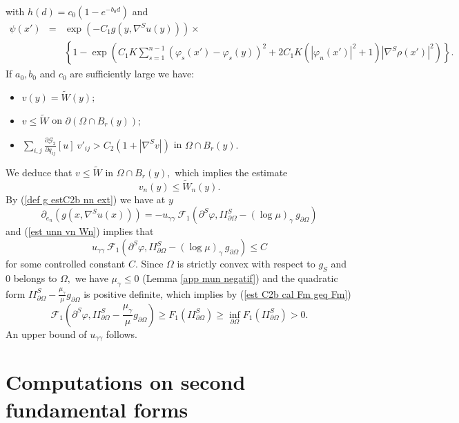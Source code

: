\documentclass[10pt,reqno,oneside]{amsart}
\theoremstyle{definition}
\theoremstyle{remark}
\begin{document}
with $h(d)=c_0(1-e^{-b_0d})$ and
\begin{eqnarray*}
\psi(x')&=&\exp\left(-C_1g(y,\nabla^S u(y))\right)\times\\
&&\left\{1-\exp \left(C_1K\sum_{s=1}^{n-1}(\varphi_s(x')-\varphi_s(y))^2+2C_1K\left(|\varphi_n(x')|^2+1\right)|\nabla^S\rho(x')|^2\right)\right\}.
\end{eqnarray*}
If $a_0,b_0$ and $c_0$ are sufficiently large we have:
\begin{itemize}
\item $v(y)=\widetilde{W}(y);$
\item $v\leq \widetilde{W}$ on $\partial(\Omega\cap B_r(y));$
\item $\displaystyle{\sum_{i,j}\frac{\partial\mathcal{G}_2}{\partial q_{ij}}[u]\ v'_{ij}> C_2(1+|\nabla^Sv|)}$ in $\Omega\cap B_r(y).$
\end{itemize}
We deduce that $v\leq \widetilde{W}$ in $\Omega\cap B_r(y),$ which implies the estimate 
\begin{equation}\label{est unn vn Wn}
v_n(y)\leq\widetilde{W}_n(y).
\end{equation} 
By (\ref{def g estC2b nn ext}) we have at $y$
$$\partial_{e_n}(g(x,\nabla^Su(x)))=-u_{\gamma\gamma}\ \mathcal{F}_1\left(\partial^S\varphi, II^S_{\partial\Omega}-(\log\mu)_\gamma\ g_{\partial\Omega}\right)$$
and (\ref{est unn vn Wn}) implies that
$$u_{\gamma\gamma}\ \mathcal{F}_{1}\left(\partial^S\varphi,II^S_{\partial\Omega}-(\log\mu)_\gamma\ g_{\partial\Omega}\right)\leq C$$
for some controlled constant $C.$ Since $\Omega$ is strictly convex with respect to $g_S$ and $0$ belongs to $\Omega,$ we have $\mu_\gamma\leq 0$ (Lemma \ref{app mun negatif}) and the quadratic form $II^S_{\partial\Omega}-\frac{\mu_\gamma}{\mu}g_{\partial\Omega}$ is positive definite, which implies by (\ref{est C2b cal Fm geq Fm})
$$\mathcal{F}_{1}\left(\partial^S\varphi,II^S_{\partial\Omega}-\frac{\mu_\gamma}{\mu}g_{\partial\Omega}\right)\geq F_1\left(II^S_{\partial\Omega}\right)\geq\inf_{\partial\Omega}F_1\left(II^S_{\partial\Omega}\right)>0.$$
An upper bound of $u_{\gamma\gamma}$ follows.

\appendix
\section{Computations on second fundamental forms}\label{appendix computations}
\end{document}
